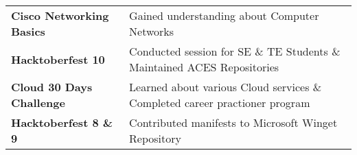 \documentclass[a4paper,10pt]{article}
\begin{document}



\begin{tabularx}{\linewidth}{@{}l X@{}}
\textbf{Cisco Networking Basics} &  \normalsize{Gained understanding about Computer Networks}\\
\textbf{Hacktoberfest 10}  &  \normalsize{Conducted session for SE \& TE Students \& Maintained ACES Repositories }\\
\textbf{Cloud 30 Days Challenge} &  \normalsize{Learned about various Cloud services \& Completed career practioner program}\\
\textbf{Hacktoberfest 8 \& 9} & \normalsize{Contributed manifests to Microsoft Winget Repository}
\end{tabularx}

\end{document}
